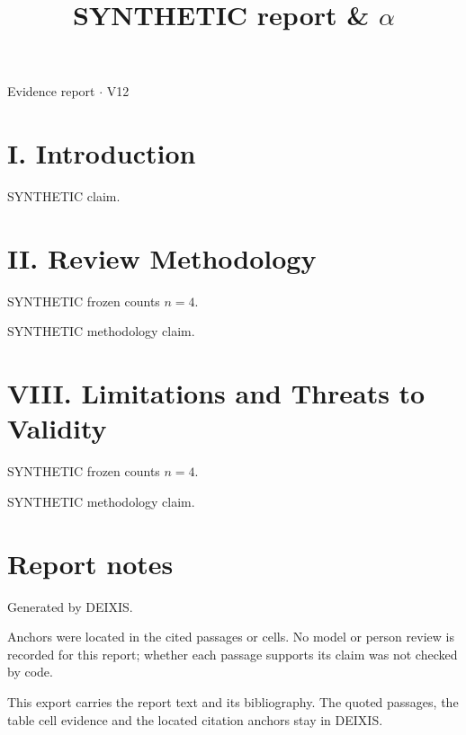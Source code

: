 \documentclass[journal]{IEEEtran}
\begin{document}
\title{SYNTHETIC report \& \ensuremath{\alpha}}

\maketitle

\noindent Evidence report \ensuremath{\cdot} V12

\section*{I. Introduction}

SYNTHETIC claim. \cite{Synth26}

\section*{II. Review Methodology}

SYNTHETIC frozen counts $n=4$.

SYNTHETIC methodology claim.

\section*{VIII. Limitations and Threats to Validity}

SYNTHETIC frozen counts $n=4$.

SYNTHETIC methodology claim.

\section*{Report notes}

Generated by DEIXIS.

Anchors were located in the cited passages or cells. No model or person review is recorded for this report; whether each passage supports its claim was not checked by code.

This export carries the report text and its bibliography. The quoted passages, the table cell evidence and the located citation anchors stay in DEIXIS.




\end{document}
